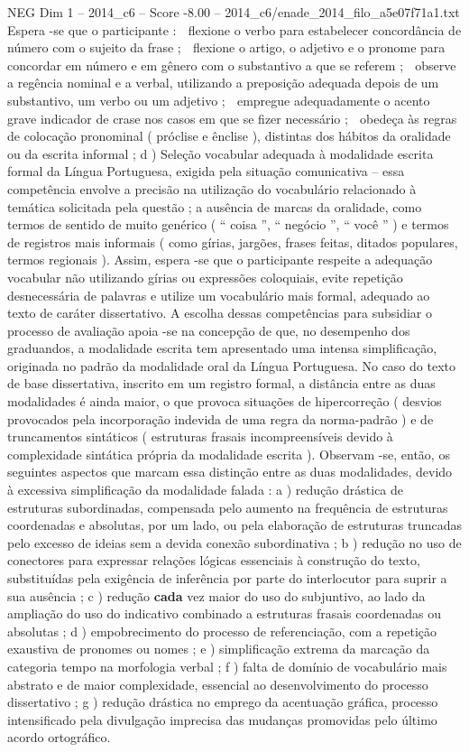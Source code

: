 \begin{textsample}{NEG Dim 1 – 2014\_c6 – Score -8.00 – 2014\_c6/enade\_2014\_filo\_a5e07f71a1.txt}
Espera -se que o participante :  flexione o verbo para estabelecer concordância de número com o sujeito da frase ;  flexione o artigo, o adjetivo e o pronome para concordar em número e em gênero com o substantivo a que se referem ;  observe a regência nominal e a verbal, utilizando a preposição adequada depois de um substantivo, um verbo ou um adjetivo ;  empregue adequadamente o acento grave indicador de crase nos casos em que se fizer necessário ;  obedeça às regras de colocação pronominal ( próclise e ênclise ), distintas dos hábitos da oralidade ou da escrita informal ; d ) Seleção vocabular adequada à modalidade escrita formal da Língua Portuguesa, exigida pela situação comunicativa – essa competência envolve a precisão na utilização do vocabulário relacionado à temática solicitada pela questão ; a ausência de marcas da oralidade, como termos de sentido de muito genérico ( “ coisa ”, “ negócio ”, “ você ” ) e termos de registros mais informais ( como gírias, jargões, frases feitas, ditados populares, termos regionais ).
Assim, espera -se que o participante respeite a adequação vocabular não utilizando gírias ou expressões coloquiais, evite repetição desnecessária de palavras e utilize um vocabulário mais formal, adequado ao texto de caráter dissertativo.
A escolha dessas competências para subsidiar o processo de avaliação apoia -se na concepção de que, no desempenho dos graduandos, a modalidade escrita tem apresentado uma intensa simplificação, originada no padrão da modalidade oral da Língua Portuguesa.
No caso do texto de base dissertativa, inscrito em um registro formal, a distância entre as duas modalidades é ainda maior, o que provoca situações de hipercorreção ( desvios provocados pela incorporação indevida de uma regra da norma-padrão ) e de truncamentos sintáticos ( estruturas frasais incompreensíveis devido à complexidade sintática própria da modalidade escrita ).
Observam -se, então, os seguintes aspectos que marcam essa distinção entre as duas modalidades, devido à excessiva simplificação da modalidade falada : a ) redução drástica de estruturas subordinadas, compensada pelo aumento na frequência de estruturas coordenadas e absolutas, por um lado, ou pela elaboração de estruturas truncadas pelo excesso de ideias sem a devida conexão subordinativa ; b ) redução no uso de conectores para expressar relações lógicas essenciais à construção do texto, substituídas pela exigência de inferência por parte do interlocutor para suprir a sua ausência ; c ) redução \textbf{cada} vez maior do uso do subjuntivo, ao lado da ampliação do uso do indicativo combinado a estruturas frasais coordenadas ou absolutas ; d ) empobrecimento do processo de referenciação, com a repetição exaustiva de pronomes ou nomes ; e ) simplificação extrema da marcação da categoria tempo na morfologia verbal ; f ) falta de domínio de vocabulário mais abstrato e de maior complexidade, essencial ao desenvolvimento do processo dissertativo ; g ) redução drástica no emprego da acentuação gráfica, processo intensificado pela divulgação imprecisa das mudanças promovidas pelo último acordo ortográfico.

\end{textsample}
